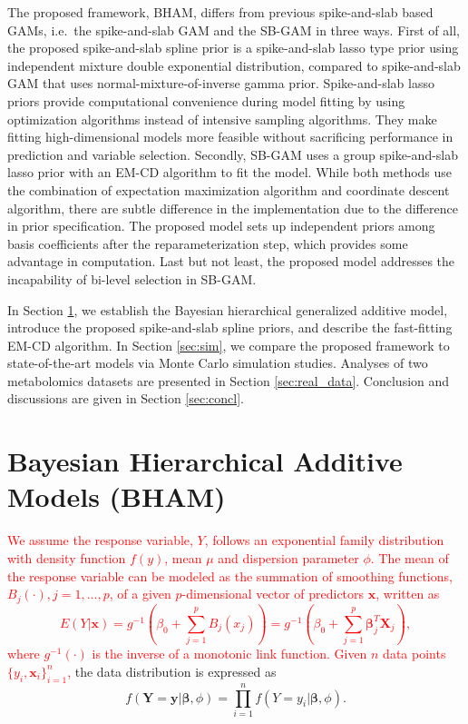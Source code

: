 \documentclass[AMA,STIX1COL,]{WileyNJD-v2}
\begin{document}
The proposed framework, BHAM, differs from previous spike-and-slab based
GAMs, i.e.~the spike-and-slab GAM \citep{Scheipl2012} and the SB-GAM
\citep{Bai2021} in three ways. First of all, the proposed spike-and-slab
spline prior is a spike-and-slab lasso type prior using independent
mixture double exponential distribution, compared to spike-and-slab GAM
that uses normal-mixture-of-inverse gamma prior. Spike-and-slab lasso
priors provide computational convenience during model fitting by using
optimization algorithms instead of intensive sampling algorithms. They
make fitting high-dimensional models more feasible without sacrificing
performance in prediction and variable selection. Secondly, SB-GAM uses
a group spike-and-slab lasso prior with an EM-CD algorithm to fit the
model. While both methods use the combination of expectation
maximization algorithm and coordinate descent algorithm, there are
subtle difference in the implementation due to the difference in prior
specification. The proposed model sets up independent priors among basis
coefficients after the reparameterization step, which provides some
advantage in computation. Last but not least, the proposed model
addresses the incapability of bi-level selection in SB-GAM.

In Section \ref{sec:BHAM}, we establish the Bayesian hierarchical
generalized additive model, introduce the proposed spike-and-slab spline
priors, and describe the fast-fitting EM-CD algorithm. In Section
\ref{sec:sim}, we compare the proposed framework to state-of-the-art
models via Monte Carlo simulation studies. Analyses of two metabolomics
datasets are presented in Section \ref{sec:real_data}. Conclusion and
discussions are given in Section \ref{sec:concl}.

\section{Bayesian Hierarchical Additive Models (BHAM)}
\label{sec:BHAM}

\textcolor{red}{We assume the response variable, $Y$, follows an exponential family distribution with density function $f(y)$, mean $\mu$ and dispersion parameter $\phi$. The mean of the response variable can be modeled as the summation of smoothing functions, $B_j(\cdot), j = 1, \dots, p$, of a given $p$-dimensional vector of predictors $\boldsymbol{x}$, written as 
\begin{equation}\label{eq:gam}
 E(Y|\boldsymbol{x}) = g^{-1}(\beta_0 + \sum\limits^p_{j=1}B_j(x_j)) = g^{-1}(\beta_0 + \sum\limits^p_{j=1} \boldsymbol{\beta}_j^T \boldsymbol{X}_j),
\end{equation}
where $g^{-1}(\cdot)$ is the inverse of a monotonic link function. Given $n$ data points $\{y_i, \boldsymbol{x}_i\}^n_{i=1}$,}
the data distribution is expressed as \begin{equation}
f(\boldsymbol{Y} = \boldsymbol{y}| \boldsymbol{\beta}, \phi) = \prod\limits^n_{i=1}f( Y = y_i|\boldsymbol{\beta}, \phi).\nonumber
\end{equation}
\end{document}
